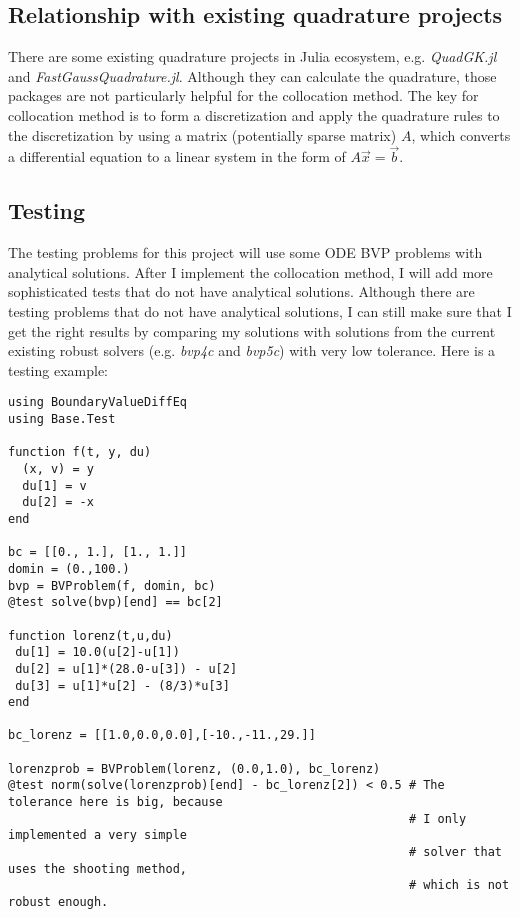 \documentclass[a4paper,11pt,onecolumn]{article}
\begin{document}
\subsection{Relationship with existing quadrature projects} %
\label{sub:relation_with_existing_quadrature}
There are some existing quadrature projects in Julia ecosystem, e.g. \textit{QuadGK.jl} and
\textit{FastGaussQuadrature.jl}. Although they can calculate the quadrature, those packages
are not particularly helpful for the collocation method. The key for collocation method is to
form a discretization and apply the quadrature rules to the discretization by using a matrix
(potentially sparse matrix) $A$, which converts a differential equation to a linear system in
the form of $A\vec{x}=\vec{b}$.

\subsection{Testing} %
\label{sub:testing}
The testing problems for this project will use some ODE BVP problems with analytical solutions.
After I implement the collocation method, I will add more sophisticated tests that do not have analytical
solutions. Although there are testing problems that do not have analytical solutions, I can
still make sure that I get the right results by comparing my solutions with solutions from
the current existing robust solvers (e.g. \textit{bvp4c} and \textit{bvp5c}) with very low
tolerance. Here is a testing example:

\begin{lstlisting}[mathescape=true]
using BoundaryValueDiffEq
using Base.Test

function f(t, y, du)
  (x, v) = y
  du[1] = v
  du[2] = -x
end

bc = [[0., 1.], [1., 1.]]
domin = (0.,100.)
bvp = BVProblem(f, domin, bc)
@test solve(bvp)[end] == bc[2]

function lorenz(t,u,du)
 du[1] = 10.0(u[2]-u[1])
 du[2] = u[1]*(28.0-u[3]) - u[2]
 du[3] = u[1]*u[2] - (8/3)*u[3]
end

bc_lorenz = [[1.0,0.0,0.0],[-10.,-11.,29.]]

lorenzprob = BVProblem(lorenz, (0.0,1.0), bc_lorenz)
@test norm(solve(lorenzprob)[end] - bc_lorenz[2]) < 0.5 # The tolerance here is big, because
														# I only implemented a very simple
														# solver that uses the shooting method,
														# which is not robust enough.
\end{lstlisting}
\end{document}
